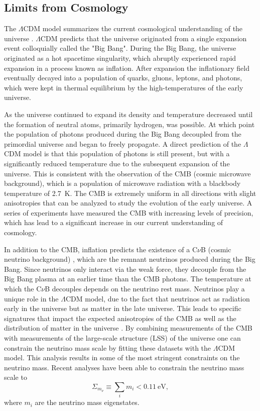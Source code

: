 \subsection{Limits from Cosmology}


The $\Lambda$CDM model summarizes the current cosmological understanding of the universe \cite{Workman:2022ynf}. $\Lambda$CDM predicts that the universe originated from a single expansion event colloquially called the "Big Bang". During the Big Bang, the universe originated as a hot spacetime singularity, which abruptly experienced rapid expansion in a process known as inflation. After expansion the inflationary field eventually decayed into a population of quarks, gluons, leptons, and photons, which were kept in thermal equilibrium by the high-temperatures of the early universe.

As the universe continued to expand its density and temperature decreased until the formation of neutral atoms, primarily hydrogen, was possible. At which point the population of photons produced during the Big Bang decoupled from the primordial universe and began to freely propagate. A direct prediction of the $\Lambda$CDM model is that this population of photons is still present, but with a significantly reduced temperature due to the subsequent expansion of the universe. This is consistent with the observation of the CMB (cosmic microwave background), which is a population of microwave radiation with a blackbody temperature of 2.7~K. The CMB is extremely uniform in all directions with slight anisotropies that can be analyzed to study the evolution of the early universe. A series of experiments have measured the CMB with increasing levels of precision, which has lead to a significant increase in our current understanding of cosmology.

In addition to the CMB, inflation predicts the existence of a C$\nu$B (cosmic neutrino background) \cite{numass_cosmo}, which are the remnant neutrinos produced during the Big Bang. Since neutrinos only interact via the weak force, they decouple from the Big Bang plasma at an earlier time than the CMB photons. The temperature at which the C$\nu$B decouples depends on the neutrino rest mass. Neutrinos play a unique role in the $\Lambda$CDM model, due to the fact that neutrinos act as radiation early in the universe but as matter in the late universe. This leads to specific signatures that impact the expected anisotropies of the CMB as well as the distribution of matter in the universe \cite{planck2015}. By combining measurements of the CMB with measurements of the large-scale structure (LSS) of the universe one can constrain the neutrino mass scale by fitting these datasets with the $\Lambda$CDM model. This analysis results in some of the most stringent constraints on the neutrino mass. Recent analyses \cite{Workman:2022ynf} have been able to constrain the neutrino mass scale to
\begin{equation}
     \Sigma_{m_\nu} \equiv \sum_{i}m_i<0.11~\mathrm{eV},
\end{equation}
where $m_i$ are the neutrino mass eigenstates. 

